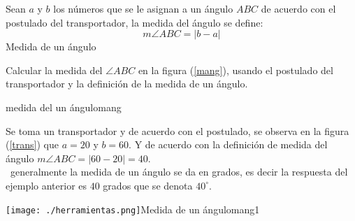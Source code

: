 \documentclass[12pt]{book}
\begin{document}
\begin{definicion}{Sean $a$ y $b$ los números que se le asignan a un ángulo
$ABC$ de acuerdo con el postulado
 del transportador, la medida del ángulo se define:
\[ m \angle{ABC}=|b-a|\]}{Medida de un ángulo}

\end{definicion}

\begin{ejemplo}{Calcular la medida del $\angle {ABC}$ en la figura (\ref{mang}), usando el postulado del transportador
y la definición de la medida de un ángulo. }
\begin{figura}{
}{medida del un ángulo}{mang}
\end{figura}
\end{ejemplo}
\solucion
Se toma un transportador y de acuerdo con el postulado, se observa  en la figura (\ref{trans}) que $a=20$
y $b=60$. Y de acuerdo con la definición de medida del ángulo $m\angle{ABC}=|60-20|=40$.\\

\nota\, generalmente la medida de un ángulo se da en grados, es decir la res\-puesta del ejemplo anterior es
$40$ grados que se denota $40^\circ$.
\begin{figura}{ \texttt{[image: ./herramientas.png]}}{Medida de un ángulo}{mang1}
\end{figura}
\end{document}
